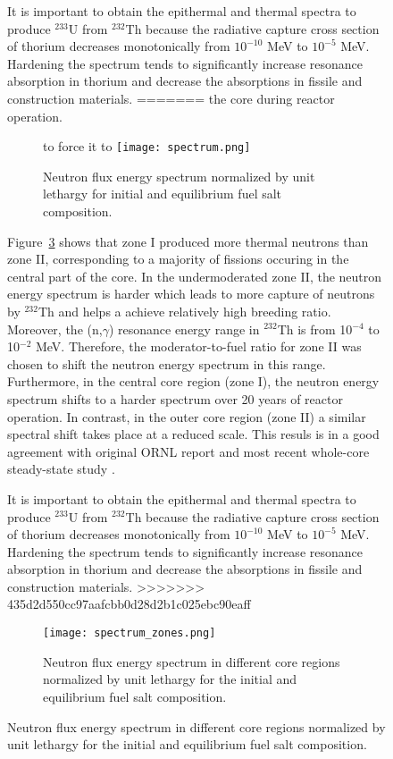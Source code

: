 \begin{figure}[htp!]
It is important to obtain the epithermal and thermal spectra to produce 
$^{233}$U from $^{232}$Th because the radiative capture cross section of thorium 
decreases monotonically from $10^{-10}$ MeV to $10^{-5}$ MeV. Hardening the 
spectrum tends to significantly increase resonance absorption in thorium and 
decrease the absorptions in fissile and construction materials. 
=======
the core during reactor operation.  \begin{figure}[ht!] %
        to force it to \centering
  \texttt{[image: spectrum.png]} \caption{Neutron flux energy 
  spectrum normalized by unit lethargy for initial and equilibrium fuel salt 
  composition.}
  \label{fig:spectrum}
\end{figure}

Figure~\ref{fig:spectrum_zones} shows that zone I produced more thermal neutrons 
than zone II, corresponding to a majority of fissions occuring in the central part 
of the core. In the undermoderated zone II, the neutron energy spectrum is harder 
which leads to more capture of neutrons by $^{232}$Th and helps a achieve relatively 
high breeding ratio. Moreover, the (n,$\gamma$) resonance energy range in $^{232}$Th 
is from 10$^{-4}$ to 10$^{-2}$ MeV. Therefore, the moderator-to-fuel ratio for zone 
II was chosen to shift the neutron energy spectrum in this range. Furthermore, in the 
central core region (zone I), the neutron energy spectrum shifts to a harder spectrum 
over 20 years of reactor operation. In contrast, in the outer core region (zone II) a 
similar spectral shift takes place at a reduced scale. This resuls is in a good 
agreement with original ORNL report \cite{robertson_conceptual_1971} and most recent 
whole-core steady-state study \cite{park_whole_2015}.

It is important to obtain the epithermal and thermal spectra to produce $^{233}$U from 
$^{232}$Th because the radiative capture cross section of thorium decreases monotonically 
from $10^{-10}$ MeV to $10^{-5}$ MeV. Hardening the spectrum tends to significantly 
increase resonance absorption in thorium and decrease the absorptions in fissile and 
construction materials. 
>>>>>>> 435d2d550cc97aafcbb0d28d2b1c025ebc90eaff
\begin{figure}[ht!] %
  \centering
  \texttt{[image: spectrum\_zones.png]} 
  \caption{Neutron flux energy spectrum in different core regions normalized by 
unit lethargy for the initial and equilibrium fuel salt composition.}
  \label{fig:spectrum_zones}
\end{figure}


\end{figure}
